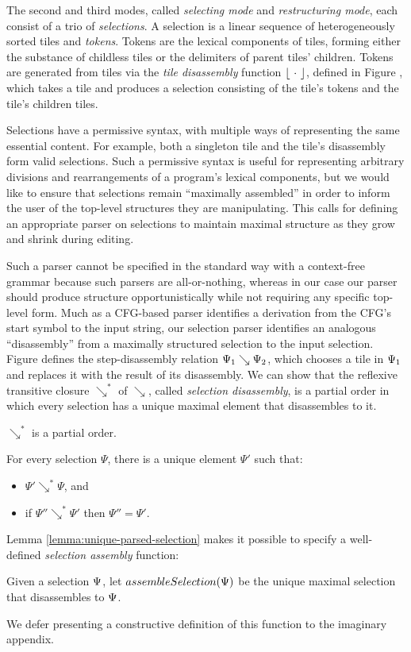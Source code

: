 The second and third modes, called \emph{selecting mode}
and \emph{restructuring mode}, each consist of a trio of
\emph{selections}.
A selection is a linear sequence of heterogeneously
sorted tiles and \emph{tokens}.
Tokens are the lexical components of tiles, forming either
the substance of childless tiles or the delimiters of parent
tiles' children.
Tokens are generated from tiles via the \emph{tile disassembly} function
$\left\lfloor~\cdot~\right\rfloor$, defined in Figure ,
which takes a tile and produces
a selection consisting of the tile's tokens
and the tile's children tiles.

Selections have a permissive syntax, with multiple
ways of representing the same essential content.
For example, both a singleton tile and the tile's disassembly
form valid selections.
Such a permissive syntax is useful for representing
arbitrary divisions and rearrangements of a program's
lexical components, but we would like to ensure
that selections remain ``maximally assembled''
in order to inform the user of the top-level structures
they are manipulating.
This calls for defining an appropriate
parser on selections to maintain
maximal structure as they grow and shrink during editing.

Such a parser cannot be specified in the standard way
with a context-free grammar because such parsers are
all-or-nothing, whereas in our case our parser should
produce structure opportunistically while not requiring any
specific top-level form.
Much as a CFG-based parser identifies a derivation from
the CFG's start symbol to the input string,
our selection parser identifies an analogous ``disassembly'' from
a maximally structured selection to the input selection.
Figure  defines the step-disassembly relation $\Psi_1\searrow\Psi_2$,
which chooses a tile in $\Psi_1$ and replaces it with the
result of its disassembly.
We can show that the reflexive transitive
closure $\searrow^*$ of $\searrow$, called \emph{selection disassembly},
is a partial order in
which every selection has a unique maximal element that
disassembles to it.
\begin{lemma}
  $\searrow^*$ is a partial order.
\end{lemma}
\begin{lemma}\label{lemma:unique-parsed-selection}
  For every selection $\Psi$, there is a unique
  element $\Psi'$ such that:
  \begin{itemize}
  \item $\Psi'\searrow^*\Psi$, and
  \item if $\Psi''\searrow^*\Psi'$ then $\Psi'' = \Psi'$.
  \end{itemize}
\end{lemma}
Lemma \ref{lemma:unique-parsed-selection} makes it
possible to specify a well-defined \emph{selection assembly}
function:
\begin{definition}
  Given a selection $\Psi$, let $assembleSelection(\Psi)$ be
  the unique maximal selection that disassembles
  to $\Psi$.
\end{definition}
We defer presenting a constructive definition of this function
to the imaginary appendix.

